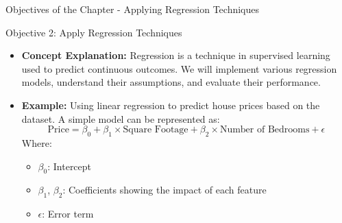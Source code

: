\documentclass[aspectratio=169]{beamer}
\begin{document}
\begin{frame}[fragile]{Objectives of the Chapter - Applying Regression Techniques}
    \begin{block}{Objective 2: Apply Regression Techniques}
        \begin{itemize}
            \item \textbf{Concept Explanation:} Regression is a technique in supervised learning used to predict continuous outcomes. We will implement various regression models, understand their assumptions, and evaluate their performance.
            \item \textbf{Example:} Using linear regression to predict house prices based on the dataset. A simple model can be represented as:
            \begin{equation}
            \text{Price} = \beta_0 + \beta_1 \times \text{Square Footage} + \beta_2 \times \text{Number of Bedrooms} + \epsilon
            \end{equation}
            Where:
            \begin{itemize}
                \item $\beta_0$: Intercept
                \item $\beta_1$, $\beta_2$: Coefficients showing the impact of each feature
                \item $\epsilon$: Error term
            \end{itemize}
        \end{itemize}
    \end{block}
\end{frame}
\end{document}
